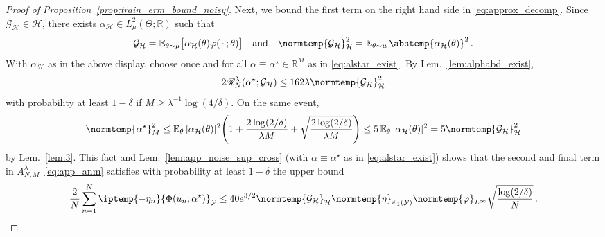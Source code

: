 \documentclass{article}
\theoremstyle{plain}
\theoremstyle{my_def}
\theoremstyle{my_rem}
\numberwithin{equation}{section}
\numberwithin{theorem}{section}%
\newcommand{\R}{\mathbb{R}}
\newcommand{\E}{\mathbb{E}}
\newcommand{\scrR}{\mathscr{R}}
\newcommand{\cG}{\mathcal{G}}
\newcommand{\cH}{\mathcal{H}}
\newcommand{\cY}{\mathcal{Y}}
\let\originalleft\left %
\let\originalright\right
\renewcommand{\left}{\mathopen{}\mathclose\bgroup\originalleft}
\renewcommand{\right}{\aftergroup\egroup\originalright}
\newcommand{\ip}{\iptemp}
\newcommand{\norm}{\normtemp}
\newcommand{\abs}{\abstemp}
\newcommand{\slot}{{\,\cdot\,}}
\renewcommand{\E}{\operatorname{\mathbb{E}}} %
\newcommand{\al}{\alpha}
\def\qa{\quad\text{and}\quad}
\newcommand{\GH}{\cG_{\cH}}
\renewcommand{\phi}{\varphi}
\newcommand{\alst}{\al^{\star}}
\begin{document}
\begin{proof}[Proof of Proposition~\ref{prop:train_erm_bound_noisy}]
    Next, we bound the first term on the right hand side in \eqref{eq:approx_decomp}. Since $\GH\in\cH$, there exists $\al_\cH\in L^2_\mu(\Theta;\R)$ such that
    \begin{equation*}
            \GH=\E_{\theta\sim\mu}\bigl[\al_\cH(\theta)\phi(\slot;\theta)\bigr]\qa \norm{\GH}_\cH^2=\E_{\theta\sim\mu}\abs{\al_\cH(\theta)}^2\,.
    \end{equation*}
    With $\al_\cH$ as in the above display, choose once and for all $\al\equiv \alst\in\R^M$ as in \eqref{eq:alstar_exist}. By Lem.~\ref{lem:alphabd_exist},
    \begin{equation}\label{eq:app_risk_repeat_bound}
        2\scrR_N^\lambda(\alst;\GH)\leq 162 \lambda \norm{\GH}_\cH^2
    \end{equation}
    with probability at least $1-\delta$ if $M\geq \lambda^{-1}\log(4/\delta)$. On the same event,
    \begin{equation*}
    \norm{\alst}^2_M\leq \E_\theta |\al_\cH(\theta)|^2 
    \left(
    1 + \frac{2\log(2/\delta)}{\lambda M} + \sqrt{\frac{2\log(2/\delta)}{\lambda M}}
    \right)
    \leq 5\E_\theta |\al_\cH(\theta)|^2=5\norm{\GH}_\cH^2
    \end{equation*}
    by Lem.~\ref{lem:3}. This fact and Lem.~\ref{lem:app_noise_sup_cross} (with $\al\equiv \alst$ as in \eqref{eq:alstar_exist}) shows that the second and final term in $A_{N,M}^\lambda$~\eqref{eq:app_anm} satisfies with probability at least $1-\delta$ the upper bound
    \begin{equation}\label{eq:app_noise_cross_temp}
          \frac{2}{N}\sum_{n=1}^N\ip{-\eta_n}{\Phi(u_n;\alst)}_\cY
          \leq 40e^{3/2}{\norm{\GH}_{\cH}}\norm{\eta}_{\psi_1(\cY)}\norm{\phi}_{L^\infty}\sqrt{\frac{\log(2/\delta)}{N}}\,.
    \end{equation}
     

\end{proof}
\end{document}
